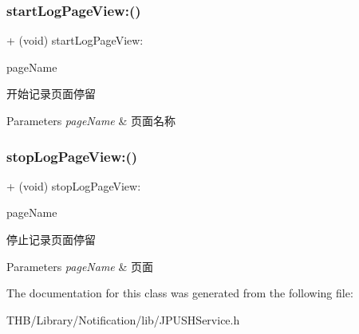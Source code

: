 \subsubsection{\texorpdfstring{start\+Log\+Page\+View\+:()}{startLogPageView:()}}
{\footnotesize\ttfamily + (void) start\+Log\+Page\+View\+: \begin{DoxyParamCaption}\item[{(N\+S\+String $\ast$)}]{page\+Name }\end{DoxyParamCaption}}

开始记录页面停留


\begin{DoxyParams}{Parameters}
{\em page\+Name} & 页面名称 \\
\hline
\end{DoxyParams}
\mbox{\label{interface_j_p_u_s_h_service_ab86f867ba03f2be249784a9f2e703f69}} 
\subsubsection{\texorpdfstring{stop\+Log\+Page\+View\+:()}{stopLogPageView:()}}
{\footnotesize\ttfamily + (void) stop\+Log\+Page\+View\+: \begin{DoxyParamCaption}\item[{(N\+S\+String $\ast$)}]{page\+Name }\end{DoxyParamCaption}}

停止记录页面停留


\begin{DoxyParams}{Parameters}
{\em page\+Name} & 页面 \\
\hline
\end{DoxyParams}


The documentation for this class was generated from the following file\+:\begin{DoxyCompactItemize}
\item 
T\+H\+B/\+Library/\+Notification/lib/J\+P\+U\+S\+H\+Service.\+h\end{DoxyCompactItemize}

